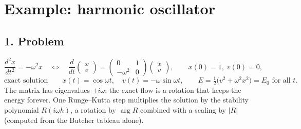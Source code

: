 \documentclass[11pt,a4paper]{article}
\begin{document}
\section*{Example: harmonic oscillator}

\subsection*{1. Problem}
\begin{equation*}
  \frac{d^2x}{dt^2} = -\omega^2 x
  \quad\Longleftrightarrow\quad
  \frac{d}{dt}\begin{pmatrix} x \\ v \end{pmatrix}
  = \begin{pmatrix} 0 & 1 \\ -\omega^2 & 0 \end{pmatrix}
    \begin{pmatrix} x \\ v \end{pmatrix},
  \qquad x(0) = 1,\; v(0) = 0,
\end{equation*}
\begin{equation*}
  \text{exact solution}\qquad x(t) = \cos\omega t, \quad v(t) = -\omega\sin\omega t,
  \qquad E = \tfrac12\bigl(v^2 + \omega^2 x^2\bigr) = E_0 \text{ for all } t .
\end{equation*}
The matrix has eigenvalues $\pm i\omega$: the exact flow is a rotation that
keeps the energy forever. One Runge--Kutta step multiplies the solution by
the stability polynomial $R(i\omega h)$, a rotation by $\arg R$ combined with
a scaling by $|R|$ (computed from the Butcher tableau alone).
\begin{center}
\small

\end{center}
\end{document}
